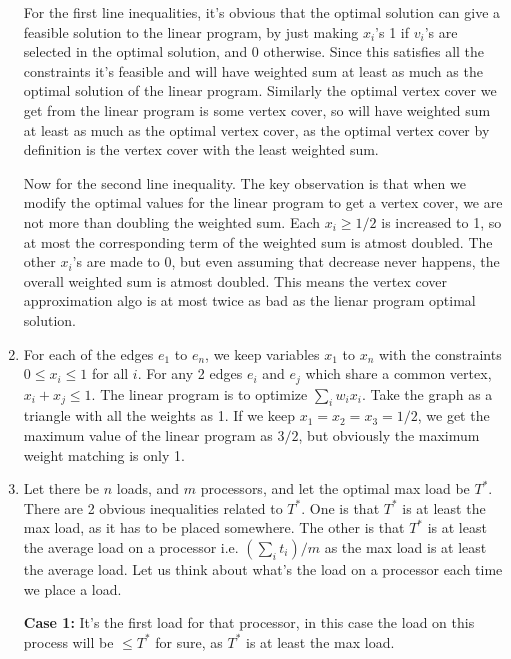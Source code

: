 \documentclass[12pt]{report}
\begin{document}
\begin{enumerate}[label=\textbf{\arabic*.}]
    For the first line inequalities, it's obvious that the optimal solution can give a feasible solution to the linear program, by just
    making $x_i$'s 1 if $v_i$'s are selected in the optimal solution, and 0 otherwise. Since this satisfies all the constraints it's 
    feasible and will have weighted sum at least as much as the optimal solution of the linear program. Similarly the optimal vertex cover
    we get from the linear program is some vertex cover, so will have weighted sum at least as much as the optimal vertex cover, as the 
    optimal vertex cover by definition is the vertex cover with the least weighted sum.

    Now for the second line inequality. The key observation is that when we modify the optimal values for the linear program to get a
    vertex cover, we are not more than doubling the weighted sum. Each $x_i \geq 1/2$ is increased to 1, so at most the corresponding 
    term of the weighted sum is atmost doubled. The other $x_i$'s are made to 0, but even assuming that decrease never happens, the 
    overall weighted sum is atmost doubled. This means the vertex cover approximation algo is at most twice as bad as the lienar program
    optimal solution.

    \item For each of the edges $e_1$ to $e_n$, we keep variables $x_1$ to $x_n$ with the constraints $0 \leq x_i \leq 1$ for all $i$.
    For any 2 edges $e_i$ and $e_j$ which share a common vertex, $x_i + x_j \leq 1$. The linear program is to optimize $\sum_i w_i x_i$.
    Take the graph as a triangle with all the weights as 1. If we keep $x_1 = x_2 = x_3 = 1/2$, we get the maximum value of the linear 
    program as $3/2$, but obviously the maximum weight matching is only 1.

    \item Let there be $n$ loads, and $m$ processors, and let the optimal max load be $T^*$. There are 2 obvious inequalities related to 
    $T^*$. One is that $T^*$ is at least the max load, as it has to be placed somewhere. The other is that $T^*$ is at least the average 
    load on a processor i.e. $\left(\sum_i t_i\right) / m$ as the max load is at least the average load.
    Let us think about what's the load on a processor each time we place a load.

    \textbf{Case 1: }It's the first load for that processor, in this case the load on this process will be $\leq T^*$ for sure, as $T^*$ 
    is at least the max load.


\end{enumerate}
\end{document}
